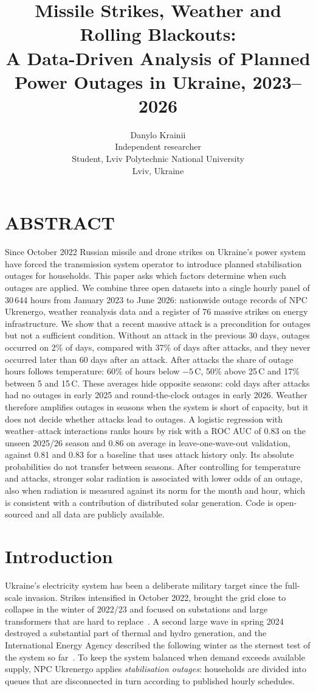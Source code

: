 \documentclass[9pt,twocolumn,letterpaper]{extarticle}
\title{\vspace{-1.5em}\Large\bfseries Missile Strikes, Weather and Rolling Blackouts:\\ A Data-Driven Analysis of Planned Power Outages in Ukraine, 2023--2026}
\author{Danylo Krainii\\[2pt]\normalsize Independent researcher\\\normalsize Student, Lviv Polytechnic National University\\\normalsize Lviv, Ukraine}
\date{}
\begin{document}
\twocolumn[
\maketitle
\vspace{-1.5em}
]

\section*{ABSTRACT}
Since October 2022 Russian missile and drone strikes on Ukraine's power system have forced the transmission system operator to introduce planned stabilisation outages for households. This paper asks which factors determine when such outages are applied. We combine three open datasets into a single hourly panel of 30\,644 hours from January 2023 to June 2026: nationwide outage records of NPC Ukrenergo, weather reanalysis data and a register of 76 massive strikes on energy infrastructure. We show that a recent massive attack is a precondition for outages but not a sufficient condition. Without an attack in the previous 30 days, outages occurred on 2\% of days, compared with 37\% of days after attacks, and they never occurred later than 60 days after an attack. After attacks the share of outage hours follows temperature: 60\% of hours below $-5$\,\textdegree C, 50\% above 25\,\textdegree C and 17\% between 5 and 15\,\textdegree C. These averages hide opposite seasons: cold days after attacks had no outages in early 2025 and round-the-clock outages in early 2026. Weather therefore amplifies outages in seasons when the system is short of capacity, but it does not decide whether attacks lead to outages. A logistic regression with weather--attack interactions ranks hours by risk with a ROC AUC of 0.83 on the unseen 2025/26 season and 0.86 on average in leave-one-wave-out validation, against 0.81 and 0.83 for a baseline that uses attack history only. Its absolute probabilities do not transfer between seasons. After controlling for temperature and attacks, stronger solar radiation is associated with lower odds of an outage, also when radiation is measured against its norm for the month and hour, which is consistent with a contribution of distributed solar generation. Code is open-sourced and all data are publicly available.

\section{Introduction}
Ukraine's electricity system has been a deliberate military target since the full-scale invasion. Strikes intensified in October 2022, brought the grid close to collapse in the winter of 2022/23 and focused on substations and large transformers that are hard to replace~\cite{crs}. A second large wave in spring 2024 destroyed a substantial part of thermal and hydro generation, and the International Energy Agency described the following winter as the sternest test of the system so far~\cite{iea}. To keep the system balanced when demand exceeds available supply, NPC Ukrenergo applies \emph{stabilisation outages}: households are divided into queues that are disconnected in turn according to published hourly schedules.
\end{document}
